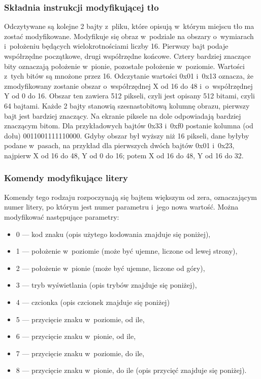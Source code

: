\subsubsection*{Składnia instrukcji modyfikującej tło}
Odczytywane są kolejne 2 bajty z~pliku, które opisują w~którym miejscu tło ma zostać modyfikowane. Modyfikuje się obraz w~podziale na obszary o~wymiarach i~położeniu będących wielokrotnościami liczby 16. Pierwszy bajt podaje współrzędne początkowe, drugi współrzędne końcowe. Cztery bardziej znaczące bity oznaczają położenie w~pionie, pozostałe położenie w~poziomie. Wartości z~tych bitów są mnożone przez 16. Odczytanie wartości 0x01 i~0x13 oznacza, że zmodyfikowany zostanie obszar o~współrzędnej X od 16 do 48 i~o~współrzędnej Y od 0 do 16. Obszar ten zawiera 512 pikseli, czyli jest opisany 512 bitami, czyli 64 bajtami. Każde 2 bajty stanowią szesnastobitową kolumnę obrazu, pierwszy bajt jest bardziej znaczący. Na ekranie piksele na dole odpowiadają bardziej znaczącym bitom. Dla przykładowych bajtów 0x33 i~0xf0 postanie kolumna (od dołu) 0011001111110000. Gdyby obszar był wyższy niż 16 pikseli, dane byłyby podane w~pasach, na przykład dla pierwszych dwóch bajtów 0x01 i~0x23, najpierw X od 16 do 48, Y od 0 do 16; potem X od 16 do 48, Y od 16 do 32.

\subsubsection*{Komendy modyfikujące litery}
Komendy tego rodzaju rozpoczynają się bajtem większym od zera, oznaczającym numer litery, po którym jest numer parametru i~jego nowa wartość. Można modyfikować następujące parametry:
\begin{itemize}
\item 0 --- kod znaku (opis użytego kodowania znajduje się poniżej),
\item 1 --- położenie w~poziomie (może być ujemne, liczone od lewej strony),
\item 2 --- położenie w~pionie (może być ujemne, liczone od góry),
\item 3 --- tryb wyświetlania (opis trybów znajduje się poniżej),
\item 4 --- czcionka (opis czcionek znajduje się poniżej)
\item 5 --- przycięcie znaku w~poziomie, od ile,
\item 6 --- przycięcie znaku w~pionie, od ile,
\item 7 --- przycięcie znaku w~poziomie, do ile,
\item 8 --- przycięcie znaku w~pionie, do ile (opis przycięć znajduje się poniżej).
\end{itemize}

